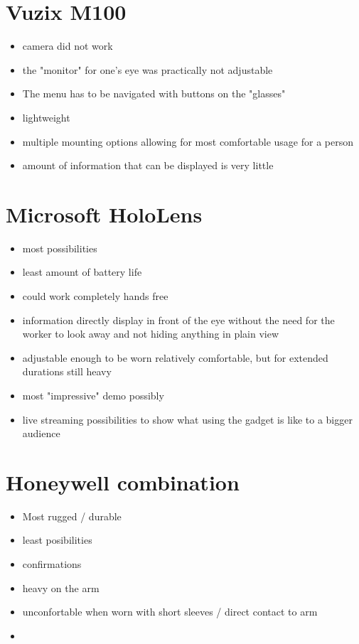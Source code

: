 \documentclass[a4paper]{report}
\begin{document}
\section*{Vuzix M100}
\begin{itemize}
	\item camera did not work
	\item the "monitor" for one's eye was practically not adjustable
	\item The menu has to be navigated with buttons on the "glasses"
	\item lightweight
	\item multiple mounting options allowing for most comfortable usage for a person
	\item amount of information that can be displayed is very little
\end{itemize}
\section*{Microsoft HoloLens}
\begin{itemize}
	\item most possibilities
	\item least amount of battery life
	\item could work completely hands free
	\item information directly display in front of the eye without the need for the worker to look away and not hiding anything in plain view
	\item adjustable enough to be worn relatively comfortable, but for extended durations still heavy
	\item most "impressive" demo possibly
	\item live streaming possibilities to show what using the gadget is like to a bigger audience
\end{itemize}

\section*{Honeywell combination}
\begin{itemize}
	\item Most rugged / durable
	\item least posibilities
	\item confirmations 
	\item heavy on the arm
	\item unconfortable when worn with short sleeves / direct contact to arm
	\item 
\end{itemize}
\end{document}
